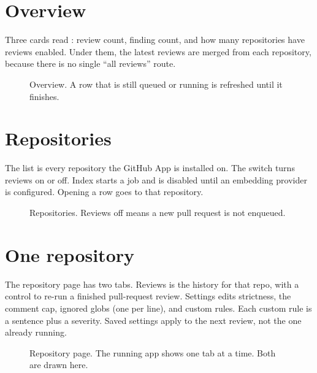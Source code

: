 \section{Overview}

Three cards read : review count, finding count, and how many repositories have reviews enabled. Under them, the latest reviews are merged from each repository, because there is no single ``all reviews'' route.

\begin{figure}[H]
  \centering
  \resizebox{\linewidth}{!}{}
  \caption{Overview. A row that is still queued or running is refreshed until it finishes.}
  \label{fig:mock-overview}
\end{figure}

\section{Repositories}

The list is every repository the GitHub App is installed on. The switch turns reviews on or off. Index starts a job and is disabled until an embedding provider is configured. Opening a row goes to that repository.

\begin{figure}[H]
  \centering
  \resizebox{\linewidth}{!}{}
  \caption{Repositories. Reviews off means a new pull request is not enqueued.}
  \label{fig:mock-repos}
\end{figure}

\section{One repository}

The repository page has two tabs. Reviews is the history for that repo, with a control to re-run a finished pull-request review. Settings edits strictness, the comment cap, ignored globs (one per line), and custom rules. Each custom rule is a sentence plus a severity. Saved settings apply to the next review, not the one already running.

\begin{figure}[H]
  \centering
  \resizebox{\linewidth}{!}{}
  \caption{Repository page. The running app shows one tab at a time. Both are drawn here.}
  \label{fig:mock-repo}
\end{figure}

